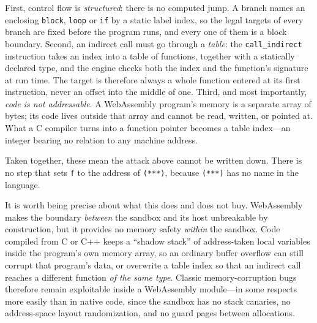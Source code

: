 \documentclass[
  letterpaper,
]{scrbook}
\theoremstyle{definition}
\theoremstyle{plain}
\theoremstyle{plain}
\theoremstyle{remark}
\begin{document}
First, control flow is \emph{structured}: there is no computed jump. A
branch names an enclosing \texttt{block}, \texttt{loop} or \texttt{if}
by a static label index, so the legal targets of every branch are fixed
before the program runs, and every one of them is a block boundary.
Second, an indirect call must go through a \emph{table}: the
\texttt{call\_indirect} instruction takes an index into a table of
functions, together with a statically declared type, and the engine
checks both the index and the function's signature at run time. The
target is therefore always a whole function entered at its first
instruction, never an offset into the middle of one. Third, and most
importantly, \emph{code is not addressable}. A WebAssembly program's
memory is a separate array of bytes; its code lives outside that array
and cannot be read, written, or pointed at. What a C compiler turns into
a function pointer becomes a table index---an integer bearing no
relation to any machine address.

Taken together, these mean the attack above cannot be written down.
There is no step that sets \texttt{f} to the address of \texttt{(***)},
because \texttt{(***)} has no name in the language.


It is worth being precise about what this does and does not buy.
WebAssembly makes the boundary \emph{between} the sandbox and its host
unbreakable by construction, but it provides no memory safety
\emph{within} the sandbox. Code compiled from C or C++ keeps a ``shadow
stack'' of address-taken local variables inside the program's own memory
array, so an ordinary buffer overflow can still corrupt that program's
data, or overwrite a table index so that an indirect call reaches a
different function \emph{of the same type}. Classic memory-corruption
bugs therefore remain exploitable inside a WebAssembly module---in some
respects more easily than in native code, since the sandbox has no stack
canaries, no address-space layout randomization, and no guard pages
between allocations.
\end{document}
